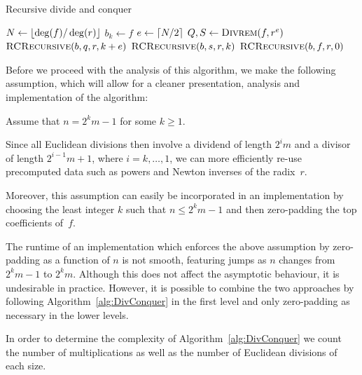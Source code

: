 \begin{algorithm}[H]
\caption{Recursive divide and conquer}
\label{alg:DivConquer}
\begin{algorithmic}
\vspace{1mm}
\State $N \gets \left\lfloor\deg(f) / \deg(r)\right\rfloor$
\State $b_k \gets f$
\Else
\State $e \gets \left\lceil N/2\right\rceil$
\State $Q, S \gets \Call{Divrem}{f, r^{e}}$
\State $\Call{RCRecursive}{b, q, r, k + e}$
\State $\Call{RCRecursive}{b, s, r, k}$
\EndIf
\EndProcedure
{}
\State $\Call{RCRecursive}{b, f, r, 0}$
\EndProcedure
\end{algorithmic}
\end{algorithm}

Before we proceed with the analysis of this algorithm, we make the 
following assumption, which will allow for a cleaner presentation, 
analysis and implementation of the algorithm:
\begin{notation}
Assume that $n = 2^k m - 1$ for some $k \geq 1$.
\end{notation}

\begin{rem}
Since all Euclidean divisions then involve a dividend of 
length $2^{i} m$ and a divisor of length $2^{i-1} m + 1$, 
where $i = k, \dotsc, 1$, we can more efficiently re-use 
precomputed data such as powers and Newton inverses of 
the radix~$r$.

Moreover, this assumption can easily be incorporated in an 
implementation by choosing the least integer $k$ such that 
$n \leq 2^k m - 1$ and then zero-padding the top coefficients 
of~$f$.
\end{rem}

\begin{rem}
The runtime of an implementation which enforces the above 
assumption by zero-padding as a function of $n$ is 
not smooth, featuring jumps as $n$ changes from 
$2^k m - 1$ to $2^k m$.  Although this does not 
affect the asymptotic behaviour, it is undesirable in 
practice.  However, it is possible to combine the two 
approaches by following Algorithm~\ref{alg:DivConquer} in the 
first level and only zero-padding as necessary in the lower 
levels.
\end{rem}

In order to determine the complexity of Algorithm~\ref{alg:DivConquer} 
we count the number of multiplications as well as the number of 
Euclidean divisions of each size.

